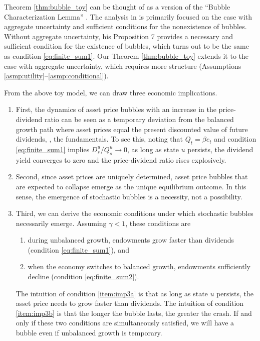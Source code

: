 \documentclass[a4paper,12pt]{article}
\numberwithin{equation}{section}
\theoremstyle{plain}
\begin{document}
Theorem \ref{thm:bubble_toy} can be thought of as a version of the ``Bubble Characterization Lemma'' \citep[Proposition 7]{Montrucchio2004}. The analysis in \citet{Montrucchio2004} is primarily focused on the case with aggregate uncertainty and sufficient conditions for the nonexistence of bubbles. Without aggregate uncertainty, his Proposition 7 provides a necessary and sufficient condition for the existence of bubbles, which turns out to be the same as condition \eqref{eq:finite_sum1}. Our Theorem \ref{thm:bubble_toy} extends it to the case with aggregate uncertainty, which requires more structure (Assumptions \ref{asmp:utility}--\ref{asmp:conditional}).

From the above toy model, we can draw three economic implications. 

\begin{enumerate}
    \item\label{item:imp1} First, the dynamics of asset price bubbles with an increase in the price-dividend ratio can be seen as a temporary deviation from the balanced growth path where asset prices equal the present discounted value of future dividends, \ie, the fundamentals. To see this, noting that $Q_t=\beta e_t$ and condition \eqref{eq:finite_sum1} implies $D_s^u/Q_s^u\to 0$, as long as state $u$ persists, the dividend yield converges to zero and the price-dividend ratio rises explosively.
    \item\label{item:imp2} Second, since asset prices are uniquely determined, asset price bubbles that are expected to collapse emerge as the unique equilibrium outcome. In this sense, the emergence of stochastic bubbles is a necessity, not a possibility.
    \item\label{item:imp3} Third, we can derive the economic conditions under which stochastic bubbles necessarily emerge. Assuming $\gamma<1$, these conditions are
    \begin{enumerate}
        \item\label{item:imp3a} during unbalanced growth, endowments grow faster than dividends (condition \eqref{eq:finite_sum1}), and
        \item\label{item:imp3b} when the economy switches to balanced growth, endowments sufficiently decline (condition \eqref{eq:finite_sum2}).
    \end{enumerate}
    The intuition of condition \ref{item:imp3a} is that as long as state $u$ persists, the asset price needs to grow faster than dividends. The intuition of condition \ref{item:imp3b} is that the longer the bubble lasts, the greater the crash. If and only if these two conditions are simultaneously satisfied, we will have a bubble even if unbalanced growth is temporary.
\end{enumerate}
\end{document}
